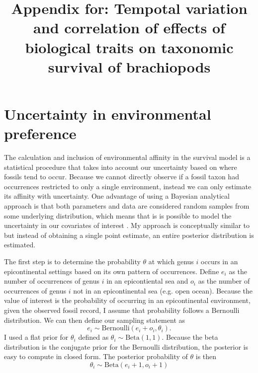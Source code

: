 \documentclass[12pt,letterpaper]{article}
\title{Appendix for: Tempotal variation and correlation of effects of biological traits on taxonomic survival of brachiopods}
\date{}
\begin{document}
\maketitle

\appendix
\section{Uncertainty in environmental preference} \label{sec:uncer}
The calculation and inclusion of environmental affinity in the survival model is a statistical procedure that takes into account our uncertainty based on where fossils tend to occur. Because we cannot directly observe if a fossil taxon had occurrences restricted to only a single environment, instead we can only estimate its affinity with uncertainty. One advantage of using a Bayesian analytical approach is that both parameters and data are considered random samples from some underlying distribution, which means that is is possible to model the uncertainty in our covariates of interest \citep{Gelman2013d}. My approach is conceptually similar to \citet{Simpson2009} but instead of obtaining a single point estimate, an entire posterior distribution is estimated.

The first step is to determine the probability \(\theta\) at which genus \(i\) occurs in an epicontinental settings based on its own pattern of occurrences. Define \(e_{i}\) as the number of occurrences of genus \(i\) in an epicontiental sea and \(o_{i}\) as the number of occurrences of genus \(i\) not in an epicontinental sea (e.g. open ocean). Because the value of interest is the probability of occurring in an epicontinental environment, given the observed fossil record, I assume that probability follows a Bernoulli distribution. We can then define our sampling statement as
\begin{equation}
  e_{i} \sim \mathrm{Bernoulli}(e_{i} + o_{i}, \theta_{i}).
  \label{eq:epi_lik}
\end{equation}
I used a flat prior for \(\theta_{i}\) defined as \(\theta_{i} \sim \mathrm{Beta}(1, 1)\). Because the beta distribution is the conjugate prior for the Bernoulli distribution, the posterior is easy to compute in closed form. The posterior probability of \(\theta\) is then 
\begin{equation}
  \theta_{i} \sim \mathrm{Beta}(e_{i} + 1, o_{i} + 1)
  \label{eq:epi_post}
\end{equation}
\end{document}
